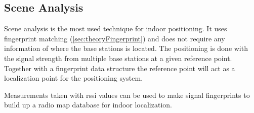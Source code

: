 \subsection{Scene Analysis}\label{sec:theoryRssiSceneAnalysis} Scene analysis
is the most used technique for indoor positioning.
It uses fingerprint matching (\cref{sec:theoryFingerprint}) and does not require any information of where the base stations is located.
The positioning is done with the signal strength from multiple base stations at a given reference point.
Together with a fingerprint data structure the reference point will act as a localization point for the positioning system.\cite{IndoorFingerprintPositioning2017} 

\bigskip

Measurements taken with \acrshort{rssi} values can be used to make signal fingerprints to build up a radio map database for indoor localization.\cite{DevelopmentMobileIndoor2017} 
